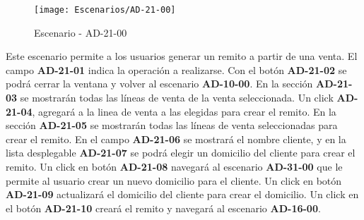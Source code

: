 \begin{figure}[H]
\centering
\texttt{[image: Escenarios/AD-21-00]}
\caption{Escenario - AD-21-00}
\label{fig:AD-21-00}
\end{figure}
Este escenario permite a los usuarios generar un remito a partir de una venta. El campo \textbf{AD-21-01} indica la operación a realizarse. Con el botón \textbf{AD-21-02} se podrá cerrar la ventana y volver al escenario \textbf{AD-10-00}. 
En la sección \textbf{AD-21-03} se mostrarán todas las líneas de venta de la venta seleccionada. Un click \textbf{AD-21-04}, agregará a la linea de venta a las elegidas para crear el remito. En la sección \textbf{AD-21-05} se mostrarán todas las líneas de venta seleccionadas para crear el remito.
En el campo \textbf{AD-21-06} se mostrará el nombre cliente, y en la lista desplegable \textbf{AD-21-07} se podrá elegir un domicilio del cliente para crear el remito. Un click en botón \textbf{AD-21-08} navegará al escenario \textbf{AD-31-00} que le permite al usuario crear un nuevo domicilio para el cliente. Un click en botón \textbf{AD-21-09} actualizará el domicilio del cliente para crear el domicilio.
Un click en el botón \textbf{AD-21-10} creará el remito y navegará al escenario \textbf{AD-16-00}.
\\
